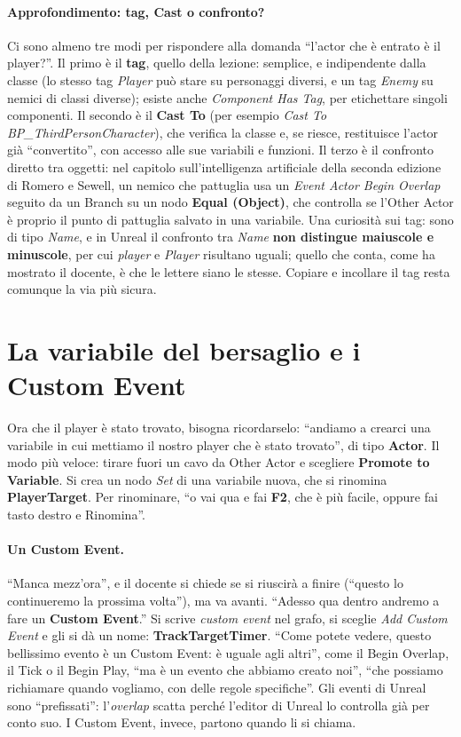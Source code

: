 \paragraph{Approfondimento: tag, Cast o confronto?} Ci sono almeno tre modi per
rispondere alla domanda ``l'actor che è entrato è il player?''. Il primo è il
\textbf{tag}, quello della lezione: semplice, e indipendente dalla classe (lo stesso tag
\emph{Player} può stare su personaggi diversi, e un tag \emph{Enemy} su nemici di classi
diverse); esiste anche \emph{Component Has Tag}, per etichettare singoli componenti. Il
secondo è il \textbf{Cast To} (per esempio \emph{Cast To BP\_ThirdPersonCharacter}),
che verifica la classe e, se riesce, restituisce l'actor già ``convertito'', con
accesso alle sue variabili e funzioni. Il terzo è il confronto diretto tra oggetti: nel
capitolo sull'intelligenza artificiale della seconda edizione di Romero e Sewell, un
nemico che pattuglia usa un \emph{Event Actor Begin Overlap} seguito da un Branch su un
nodo \textbf{Equal (Object)}, che controlla se l'Other Actor è proprio il punto di
pattuglia salvato in una variabile. Una curiosità sui tag: sono di tipo \emph{Name}, e
in Unreal il confronto tra \emph{Name} \textbf{non distingue maiuscole e minuscole},
per cui \emph{player} e \emph{Player} risultano uguali; quello che conta, come ha
mostrato il docente, è che le lettere siano le stesse. Copiare e incollare il tag
resta comunque la via più sicura.

\section{La variabile del bersaglio e i Custom Event}
\label{ue4:sec:custom}

Ora che il player è stato trovato, bisogna ricordarselo: ``andiamo a crearci una
variabile in cui mettiamo il nostro player che è stato trovato'', di tipo
\textbf{Actor}. Il modo più veloce: tirare fuori un cavo da Other Actor e scegliere
\textbf{Promote to Variable}. Si crea un nodo \emph{Set} di una variabile nuova, che si
rinomina \textbf{PlayerTarget}. Per rinominare, ``o vai qua e fai \textbf{F2}, che è più
facile, oppure fai tasto destro e Rinomina''.

\paragraph{Un Custom Event.} ``Manca mezz'ora'', e il docente si chiede se si riuscirà a
finire (``questo lo continueremo la prossima volta''), ma va avanti. ``Adesso qua dentro
andremo a fare un \textbf{Custom Event}.'' Si scrive \emph{custom event} nel grafo, si
sceglie \emph{Add Custom Event} e gli si dà un nome: \textbf{TrackTargetTimer}. ``Come
potete vedere, questo bellissimo evento è un Custom Event: è uguale agli altri'', come
il Begin Overlap, il Tick o il Begin Play, ``ma è un evento che abbiamo creato noi'',
``che possiamo richiamare quando vogliamo, con delle regole specifiche''. Gli eventi di
Unreal sono ``prefissati'': l'\emph{overlap} scatta perché l'editor di Unreal lo
controlla già per conto suo. I Custom Event, invece, partono quando li si chiama.


